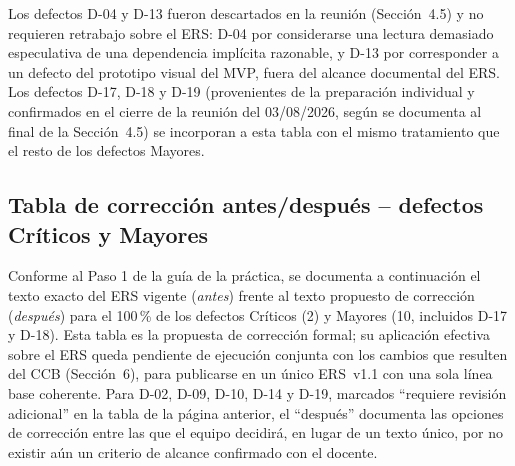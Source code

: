 \documentclass[11pt,a4paper]{article}
\begin{document}
Los defectos D-04 y D-13 fueron descartados en la reunión (Sección~4.5) y no requieren retrabajo sobre el ERS: D-04 por considerarse una lectura demasiado especulativa de una dependencia implícita razonable, y D-13 por corresponder a un defecto del prototipo visual del MVP, fuera del alcance documental del ERS. Los defectos D-17, D-18 y D-19 (provenientes de la preparación individual y confirmados en el cierre de la reunión del 03/08/2026, según se documenta al final de la Sección~4.5) se incorporan a esta tabla con el mismo tratamiento que el resto de los defectos Mayores.

\subsection{Tabla de corrección antes/después -- defectos Críticos y Mayores}
Conforme al Paso 1 de la guía de la práctica, se documenta a continuación el texto exacto del ERS vigente (\textit{antes}) frente al texto propuesto de corrección (\textit{después}) para el 100\,\% de los defectos Críticos (2) y Mayores (10, incluidos D-17 y D-18). Esta tabla es la propuesta de corrección formal; su aplicación efectiva sobre el ERS queda pendiente de ejecución conjunta con los cambios que resulten del CCB (Sección~6), para publicarse en un único ERS~v1.1 con una sola línea base coherente. Para D-02, D-09, D-10, D-14 y D-19, marcados ``requiere revisión adicional'' en la tabla de la página anterior, el ``después'' documenta las opciones de corrección entre las que el equipo decidirá, en lugar de un texto único, por no existir aún un criterio de alcance confirmado con el docente.
\end{document}
